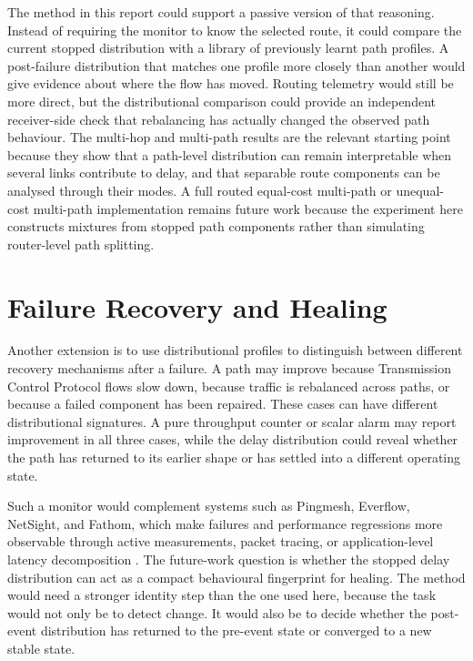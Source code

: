 \documentclass[a4paper,11pt]{report}
\begin{document}
The method in this report could support a passive version of that reasoning. Instead of requiring the monitor to know the selected route, it could compare the current stopped distribution with a library of previously learnt path profiles. A post-failure distribution that matches one profile more closely than another would give evidence about where the flow has moved. Routing telemetry would still be more direct, but the distributional comparison could provide an independent receiver-side check that rebalancing has actually changed the observed path behaviour. The multi-hop and multi-path results are the relevant starting point because they show that a path-level distribution can remain interpretable when several links contribute to delay, and that separable route components can be analysed through their modes. A full routed equal-cost multi-path or unequal-cost multi-path implementation remains future work because the experiment here constructs mixtures from stopped path components rather than simulating router-level path splitting.

\section{Failure Recovery and Healing}

Another extension is to use distributional profiles to distinguish between different recovery mechanisms after a failure. A path may improve because Transmission Control Protocol flows slow down, because traffic is rebalanced across paths, or because a failed component has been repaired. These cases can have different distributional signatures. A pure throughput counter or scalar alarm may report improvement in all three cases, while the delay distribution could reveal whether the path has returned to its earlier shape or has settled into a different operating state.

Such a monitor would complement systems such as Pingmesh, Everflow, NetSight, and Fathom, which make failures and performance regressions more observable through active measurements, packet tracing, or application-level latency decomposition \cite{guoPingmesh,zhuEverflow,handigolNetSight,qureshiFathom}. The future-work question is whether the stopped delay distribution can act as a compact behavioural fingerprint for healing. The method would need a stronger identity step than the one used here, because the task would not only be to detect change. It would also be to decide whether the post-event distribution has returned to the pre-event state or converged to a new stable state.
\end{document}
